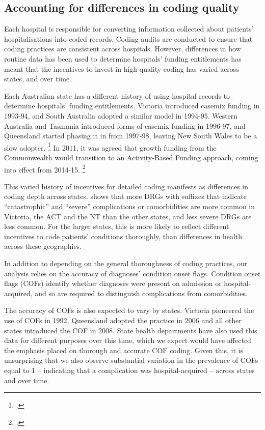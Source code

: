 \documentclass[submission]{grattan}
\begin{document}
\subsection{Accounting for differences in coding quality}\label{subsec:accounting-for-differences-in-coding-quality}

Each hospital is responsible for converting information collected about patients' hospitalisations into coded records.
Coding audits are conducted to ensure that coding practices are consistent across hospitals.
However, differences in how routine data has been used to determine hospitals' funding entitlements has meant that the incentives to invest in high-quality coding has varied across states, and over time.

Each Australian state has a different history of using hospital records to determine hospitals' funding entitlements.
Victoria introduced casemix funding in 1993-94, and South Australia adopted a similar model in 1994-95.
Western Australia and Tasmania introduced forms of casemix funding in 1996-97, and Queensland started phasing it in from 1997-98, leaving New South Wales to be a slow adopter.%
	\footcites{Duckett-1998-Casemix}{Eager-2010-What-is-activity-based-funding}
In 2011, it was agreed that growth funding from the Commonwealth would transition to an Activity-Based Funding approach, coming into effect from 2014-15.%
	\footcite{COAG2011-Natl-Health-Agreement}

This varied history of incentives for detailed coding manifests as differences in coding depth across states.
 shows that more DRGs with suffixes that indicate ``catastrophic'' and ``severe'' complications or comorbidities are more common in Victoria, the ACT and the NT than the other states, and less severe DRGs are less common.
For the larger states, this is more likely to reflect different incentives to code patients' conditions thoroughly, than differences in health across these geographies.

In addition to depending on the general thoroughness of coding practices, our analysis relies on the accuracy of diagnoses' condition onset flags.
Condition onset flags (COFs) identify whether diagnoses were present on admission or hospital-acquired, and so are required to distinguish complications from comorbidities.

The accuracy of COFs is also expected to vary by states.
Victoria pioneered the use of COFs in 1992, Queensland adopted the practice in 2006 and all other states introduced the COF in 2008.
State health departments have also used this data for different purposes over this time, which we expect would have affected the emphasis placed on thorough and accurate COF coding.
Given this, it is unsurprising that we also observe substantial variation in the prevalence of COFs equal to 1 -- indicating that a complication was hospital-acquired -- across states and over time.
\end{document}
